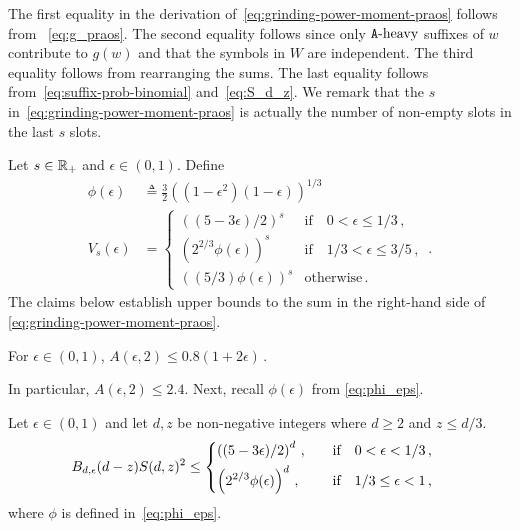 The first equality in the derivation of~\eqref{eq:grinding-power-moment-praos} follows from 
~\eqref{eq:g_praos}. 
The second equality follows 
since only $\mathtt{A}\text{-heavy}$ suffixes of $w$ contribute to $g(w)$ 
and that the symbols in $W$ are independent. 
The third equality follows from rearranging the sums. 
The last equality follows from~\eqref{eq:suffix-prob-binomial} 
and~\eqref{eq:S_d_z}. 
We remark that the $s$ in~\eqref{eq:grinding-power-moment-praos} 
is actually the number of non-empty slots in the last $s$ slots. 


Let $s \in \mathbb{R}_+$ and $\epsilon \in (0,1)$. 
Define 
\begin{align}
  \phi(\epsilon) &\triangleq \frac{3}{2} \left( (1-\epsilon^2) (1-\epsilon) \right)^{1/3}\label{eq:phi_eps} \\
  V_s(\epsilon) &= \begin{cases}
      \left( (5-3 \epsilon)/2 \right)^s & \text{if}\quad 0 < \epsilon \leq 1/3\,, \\
      \left( 2^{2/3} \phi(\epsilon) \right)^s & \text{if}\quad 1/3 < \epsilon \leq 3/5\,, \\
      \left( (5/3) \phi(\epsilon) \right)^s & \text{otherwise}\,. 
    \end{cases} 
  \,. \label{eq:V-eps-praos}
\end{align}
\noindent
The claims below establish upper bounds to the 
sum in the right-hand side of \eqref{eq:grinding-power-moment-praos}.

\begin{claim}\label{claim:multiple-honest-blocks}
  For $\epsilon \in (0, 1)$, 
  $
    A(\epsilon, 2) 
    \leq 0.8 (1 + 2 \epsilon)
    \,.
  $
\end{claim}
\noindent
In particular, $A(\epsilon, 2) \leq 2.4$. Next, recall $\phi(\epsilon)$ from  \eqref{eq:phi_eps}.

\begin{claim}\label{claim:t1star-variance-exact}
  Let $\epsilon \in (0,1)$ and 
  let $d,z$ be non-negative integers where $d \geq 2$ and $z \leq d/3$. 
  \begin{align*}
    B_{d, \epsilon}(d-z) S(d,z)^2
    &\leq \begin{dcases} 
    \left( (5-3 \epsilon)/2 \right)^d \,,
        &\quad \text{if}\quad
        0 < \epsilon < 1/3 \,, \\
    \left( 2^{2/3} \phi(\epsilon) \right)^d \,,
        &\quad \text{if}\quad
        1/3 \leq \epsilon < 1 \, ,
    \end{dcases}
  \end{align*}
  where $\phi$ is defined in~\eqref{eq:phi_eps}.
\end{claim}

